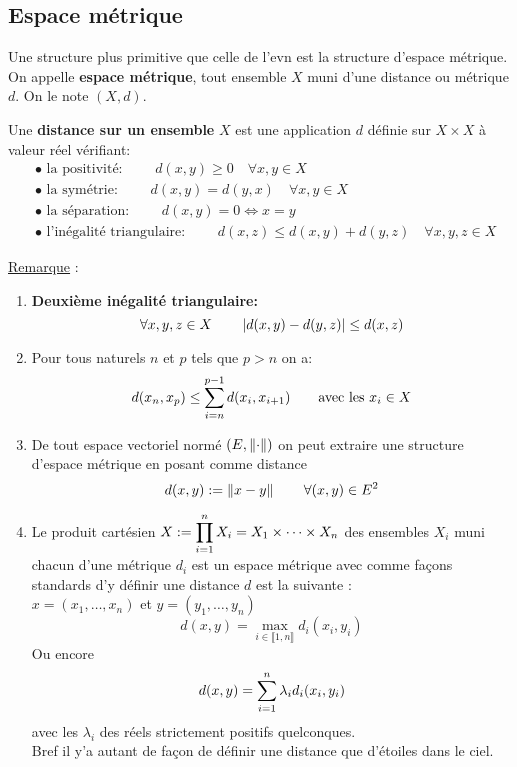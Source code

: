 \documentclass[12pt,a4paper]{article}
\begin{document}
	\subsection{Espace métrique}
	Une structure plus primitive que celle de l'evn est la structure d'espace métrique.\\
	On appelle \textbf{espace métrique}, tout ensemble $X$ muni d'une distance ou métrique $d$. On le note $\left(X, d\right)$.
	\begin{defini}
	 Une \textbf{distance sur un ensemble} $X$ est une application $d$ définie sur $X\times X$ à valeur réel vérifiant:
	\begin{align}
		&\bullet \text{ la positivité: }  \qquad d(x,y)\geq 0 \quad\forall x,y \in X\\
		&\bullet \text{ la symétrie:   } \qquad d(x,y)=d(y,x) \quad\forall x,y \in X\\ 
		&\bullet \text{ la séparation: } \qquad d(x,y)=0\Longleftrightarrow x=y \\
		&\bullet \text{ l'inégalité triangulaire: } \qquad d(x,z)\leq d(x,y)+d(y,z) \quad\forall x, y,z \in X
	\end{align}
	\end{defini}
	\underline{Remarque} : 
	\begin{enumerate}
		\item \textbf{Deuxième inégalité triangulaire:} 
		\begin{equation}
			\forall x,y,z \in X \qquad \abs{d(x,y)-d(y,z)}\leq d(x,z)
		\end{equation}
		\item Pour tous naturels $n$ et $p$ tels que $p>n$ on a:
		\begin{equation}
			d(x_n, x_p)\leq \somme{i=n}{p-1} d(x_i,x_{i+1})\qquad \text{avec les } x_i\in X
		\end{equation}
		\item De tout espace vectoriel normé $\left(E,\norm{\cdot} \right)$ on peut extraire une structure d'espace métrique en posant comme distance$$ d(x,y):=\norm{x-y}\qquad \forall (x,y) \in E^2  $$
		\item Le produit cartésien $X:=\grandm\prod\limits_{i=1}^{n} X_i=X_1\times\cdots\times X_n$ des ensembles $X_i$ muni chacun d'une métrique $d_i$ est un espace métrique avec comme façons standards d'y définir une distance $d$ est la suivante :\\
		$x=(x_1,\dots,x_n) $ et $y=(y_1,\dots,y_n) $
		\[ d(x,y)=\max\limits_{i\in \llbracket 1,n \rrbracket  } d_i(x_i,y_i) \]
		Ou  encore
		\[ d(x,y)=\somme{i=1}{n} \lambda_i d_i(x_i,y_i)  \]
		avec les $\lambda_i$ des réels strictement positifs quelconques.\\
		Bref il y'a autant de façon de définir une distance que d'étoiles dans le ciel.\\
	\end{enumerate}
	 
\end{document}
